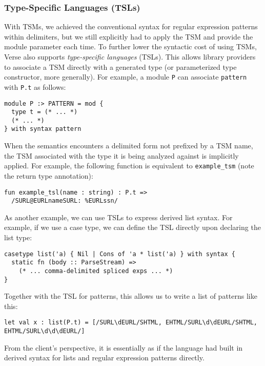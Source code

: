 \subsubsection{Type-Specific Languages (TSLs)}\label{sec:tsls}
With TSMs, we achieved the conventional syntax for regular expression patterns within delimiters, but we still explicitly had to apply the TSM and provide the module parameter each time. To further lower the syntactic cost of using TSMs, Verse also  supports \emph{type-specific languages} (TSLs). This allows library providers to associate a TSM directly with a generated type (or parameterized type constructor, more generally). For example, a module \lstinline{P} can associate \lstinline{pattern} with \lstinline{P.t} as follows:
\begin{lstlisting}[numbers=none]
module P :> PATTERN = mod {
  type t = (* ... *)
  (* ... *)
} with syntax pattern
\end{lstlisting}

When the semantics encounters a delimited form not prefixed by a TSM name, the TSM associated with the type it is being analyzed against is implicitly applied. For example, the following function is equivalent to \lstinline{example_tsm} (note the return type annotation):
\begin{lstlisting}[numbers=none]
fun example_tsl(name : string) : P.t => 
  /SURL@EURLnameSURL: %EURLssn/
\end{lstlisting}

As another example, we can use TSLs to express derived list syntax. For example, if we use a case type, we can define the TSL directly upon declaring the list type:
\begin{lstlisting}[numbers=none]
casetype list('a) { Nil | Cons of 'a * list('a) } with syntax {
  static fn (body :: ParseStream) => 
    (* ... comma-delimited spliced exps ... *)
}
\end{lstlisting}
Together with the TSL for patterns, this allows us to write a list of patterns like this:
\begin{lstlisting}[numbers=none]
let val x : list(P.t) = [/SURL\dEURL/SHTML, EHTML/SURL\d\dEURL/SHTML, EHTML/SURL\d\d\dEURL/]
\end{lstlisting}
From the client's perspective, it is essentially as if the language had built in derived syntax for lists and regular expression patterns directly.%

